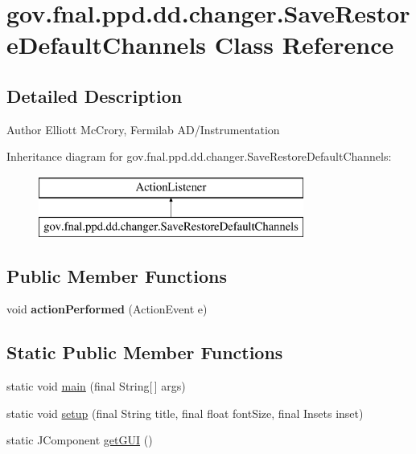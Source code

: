 \hypertarget{classgov_1_1fnal_1_1ppd_1_1dd_1_1changer_1_1SaveRestoreDefaultChannels}{\section{gov.\-fnal.\-ppd.\-dd.\-changer.\-Save\-Restore\-Default\-Channels Class Reference}
\label{classgov_1_1fnal_1_1ppd_1_1dd_1_1changer_1_1SaveRestoreDefaultChannels}
}


\subsection{Detailed Description}
\begin{DoxyAuthor}{Author}
Elliott Mc\-Crory, Fermilab A\-D/\-Instrumentation 
\end{DoxyAuthor}
Inheritance diagram for gov.\-fnal.\-ppd.\-dd.\-changer.\-Save\-Restore\-Default\-Channels\-:\begin{figure}[H]
\begin{center}
\leavevmode
\includegraphics[height=2.000000cm]{classgov_1_1fnal_1_1ppd_1_1dd_1_1changer_1_1SaveRestoreDefaultChannels}
\end{center}
\end{figure}
\subsection*{Public Member Functions}
\begin{DoxyCompactItemize}
\item 
\hypertarget{classgov_1_1fnal_1_1ppd_1_1dd_1_1changer_1_1SaveRestoreDefaultChannels_a8e4454a41c73b5fbe25212626574c507}{void {\bfseries action\-Performed} (Action\-Event e)}\label{classgov_1_1fnal_1_1ppd_1_1dd_1_1changer_1_1SaveRestoreDefaultChannels_a8e4454a41c73b5fbe25212626574c507}

\end{DoxyCompactItemize}
\subsection*{Static Public Member Functions}
\begin{DoxyCompactItemize}
\item 
static void \hyperlink{classgov_1_1fnal_1_1ppd_1_1dd_1_1changer_1_1SaveRestoreDefaultChannels_a49e137fa18de819556f440e577400af5}{main} (final String\mbox{[}$\,$\mbox{]} args)
\item 
static void \hyperlink{classgov_1_1fnal_1_1ppd_1_1dd_1_1changer_1_1SaveRestoreDefaultChannels_a42ec751770b045c82c3719d78980ccba}{setup} (final String title, final float font\-Size, final Insets inset)
\item 
static J\-Component \hyperlink{classgov_1_1fnal_1_1ppd_1_1dd_1_1changer_1_1SaveRestoreDefaultChannels_ac4d9cc40872b340a1a198a72dcdc3891}{get\-G\-U\-I} ()
\end{DoxyCompactItemize}
